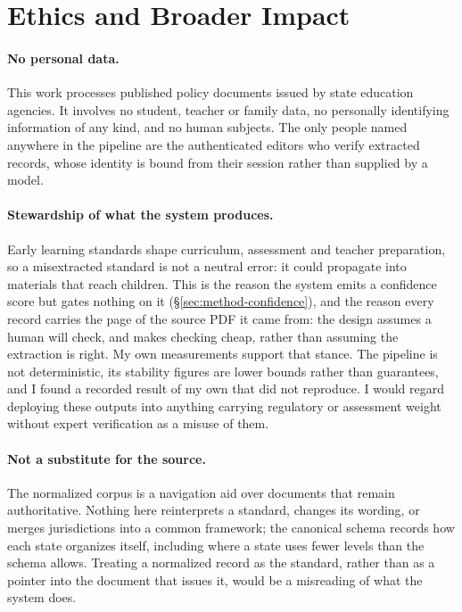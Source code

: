 \section{Ethics and Broader Impact}
\label{sec:ethics}

\paragraph{No personal data.} This work processes published policy documents
issued by state education agencies. It involves no student, teacher or family
data, no personally identifying information of any kind, and no human subjects.
The only people named anywhere in the pipeline are the authenticated editors who
verify extracted records, whose identity is bound from their session rather than
supplied by a model.

\paragraph{Stewardship of what the system produces.} Early learning standards
shape curriculum, assessment and teacher preparation, so a misextracted standard
is not a neutral error: it could propagate into materials that reach
children. This is the reason the system emits a confidence score but gates
nothing on it (\S\ref{sec:method-confidence}), and the reason every record
carries the page of the source PDF it came from: the design assumes a human will
check, and makes checking cheap, rather than assuming the extraction is right.
My own measurements support that stance. The pipeline is not deterministic, its
stability figures are lower bounds rather than guarantees, and I found a
recorded result of my own that did not reproduce. I would regard deploying
these outputs into anything carrying regulatory or assessment weight without
expert verification as a misuse of them.

\paragraph{Not a substitute for the source.} The normalized corpus is a
navigation aid over documents that remain authoritative. Nothing here
reinterprets a standard, changes its wording, or merges jurisdictions into a
common framework; the canonical schema records how each state organizes
itself, including where a state uses fewer levels than the schema allows.
Treating a normalized record as the standard, rather than as a pointer into the
document that issues it, would be a misreading of what the system does.

